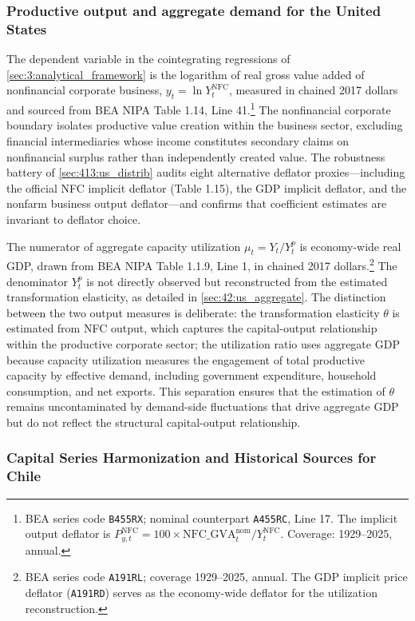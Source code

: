 \subsubsection{Productive output and aggregate demand for the United States}
The dependent variable in the cointegrating regressions of
\cref{sec:3:analytical_framework} is the logarithm of real gross
value added of nonfinancial corporate business,
$y_t = \ln Y^{\text{NFC}}_t$, measured in chained 2017 dollars and
sourced from BEA NIPA Table 1.14, Line 41.\footnote{BEA series
	code \texttt{B455RX}; nominal counterpart \texttt{A455RC}, Line 17.
	The implicit output deflator is $P^{\text{NFC}}_{y,t} = 100
	\times \text{NFC\_GVA}^{\text{nom}}_t /
	Y^{\text{NFC}}_t$. Coverage: 1929--2025, annual.} The
nonfinancial corporate boundary isolates productive value creation
within the business sector, excluding financial intermediaries whose
income constitutes secondary claims on nonfinancial surplus rather
than independently created value. The robustness battery of
\cref{sec:413:us_distrib} audits eight alternative deflator
proxies---including the official NFC implicit deflator (Table 1.15),
the GDP implicit deflator, and the nonfarm business output
deflator---and confirms that coefficient estimates are invariant to
deflator choice.

The numerator of aggregate capacity utilization $\mu_t = Y_t /
Y^p_t$ is economy-wide real GDP, drawn from BEA NIPA Table 1.1.9,
Line 1, in chained 2017 dollars.\footnote{BEA series code
	\texttt{A191RL}; coverage 1929--2025, annual. The GDP implicit
	price deflator (\texttt{A191RD}) serves as the economy-wide
	deflator for the utilization reconstruction.} The denominator
$Y^p_t$ is not directly observed but reconstructed from the
estimated transformation elasticity, as detailed in
\cref{sec:42:us_aggregate}. The distinction between the two output
measures is deliberate: the transformation elasticity $\theta$ is
estimated from NFC output, which captures the capital-output
relationship within the productive corporate sector; the utilization
ratio uses aggregate GDP because capacity utilization measures the
engagement of total productive capacity by effective demand,
including government expenditure, household consumption, and net
exports. This separation ensures that the estimation of $\theta$
remains uncontaminated by demand-side fluctuations that drive
aggregate GDP but do not reflect the structural capital-output
relationship.

\subsubsection{Capital Series Harmonization and Historical Sources for Chile}
\label{sec:414:chile_sfc}

